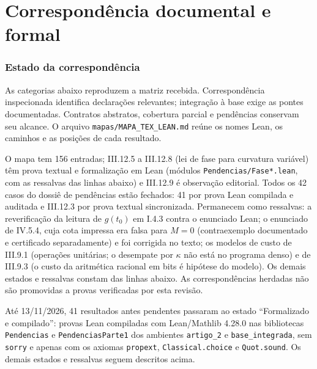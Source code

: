 \documentclass[12pt,a4paper]{article}
\theoremstyle{preciso}
\theoremstyle{definition}
\theoremstyle{preciso}
\theoremstyle{preciso}
\theoremstyle{preciso}
\theoremstyle{preciso}
\theoremstyle{definition}
\theoremstyle{preciso}
\theoremstyle{definition}
\theoremstyle{preciso}
\theoremstyle{preciso}
\theoremstyle{definition}
\begin{document}
\clearpage\part*{Correspondência documental e formal}
\begin{singlespace}\section*{Estado da correspondência}
As categorias abaixo reproduzem a matriz recebida. Correspondência inspecionada identifica declarações relevantes; integração à base exige as pontes documentadas. Contratos abstratos, cobertura parcial e pendências conservam seu alcance. O arquivo \texttt{mapas/MAPA\_TEX\_LEAN.md} reúne os nomes Lean, os caminhos e as posições de cada resultado.

O mapa tem 156 entradas; III.12.5 a III.12.8 (lei de fase para curvatura variável) têm prova textual e formalização em Lean (módulos \texttt{Pendencias/Fase*.lean}, com as ressalvas das linhas abaixo) e III.12.9 é observação editorial. Todos os 42 casos do dossiê de pendências estão fechados: 41 por prova Lean compilada e auditada e III.12.3 por prova textual sincronizada. Permanecem como ressalvas: a reverificação da leitura de $g(t_0)$ em I.4.3 contra o enunciado Lean; o enunciado de IV.5.4, cuja cota impressa era falsa para $M=0$ (contraexemplo documentado e certificado separadamente) e foi corrigida no texto; os modelos de custo de III.9.1 (operações unitárias; o desempate por $\kappa$ não está no programa denso) e de III.9.3 (o custo da aritmética racional em bits é hipótese do modelo). Os demais estados e ressalvas constam das linhas abaixo. As correspondências herdadas não são promovidas a provas verificadas por esta revisão.

Até 13/11/2026, 41 resultados antes pendentes passaram ao estado ``Formalizado e compilado'': provas Lean compiladas com Lean/Mathlib 4.28.0 nas bibliotecas \texttt{Pendencias} e \texttt{PendenciasParte1} dos ambientes \texttt{artigo\_2} e \texttt{base\_integrada}, sem \texttt{sorry} e apenas com os axiomas \texttt{propext}, \texttt{Classical.choice} e \texttt{Quot.sound}. Os demais estados e ressalvas seguem descritos acima.


\end{singlespace}
\end{document}

